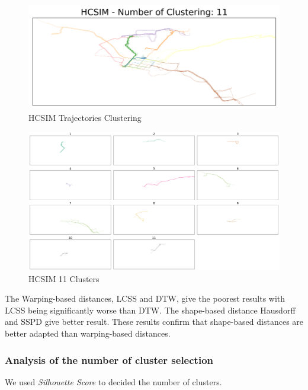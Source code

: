 \documentclass[a4paper, 12pt]{article}
\begin{document}
\begin{figure}[htbp!]
    \centering
    \includegraphics[width=1\textwidth]{hcsim_trajectory_clustering.png}
    \caption{HCSIM Trajectories Clustering}
    \label{fig29}
\end{figure}

\begin{figure}[htbp!]
    \centering
    \includegraphics[width=1\textwidth]{hcsim_11_clusters.png}
    \caption{HCSIM 11 Clusters}
    \label{fig30}
\end{figure}

\pagebreak

The Warping-based distances, LCSS and DTW, give the poorest results with LCSS being significantly worse than DTW. The shape-based distance Hausdorff and SSPD give better result. These results confirm that shape-based distances are better adapted than warping-based distances.

\subsubsection{Analysis of the number of cluster selection}

We used \textit{Silhouette Score} to decided the number of clusters.
\end{document}
